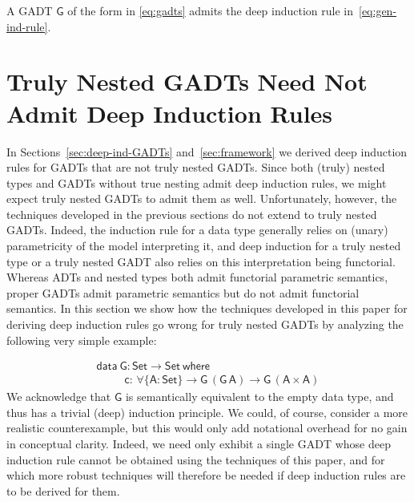 \documentclass[sigplan,10pt,anonymous,review]{acmart}
\begin{document}
\begin{theorem}
A GADT $\mathsf{G}$ of the form in \eqref{eq:gadts} admits the deep
induction rule in~\eqref{eq:gen-ind-rule}.
\end{theorem}

\section{Truly Nested GADTs Need Not Admit Deep Induction
    Rules}\label{sec:GADT-nested}

In Sections~\ref{sec:deep-ind-GADTs} and~\ref{sec:framework} we
derived deep induction rules for GADTs that are not truly nested
GADTs. Since both (truly) nested types and GADTs without true nesting
admit deep induction rules, we might expect truly nested GADTs to
admit them as well. Unfortunately, however, the techniques developed
in the previous sections do not extend to truly nested GADTs. Indeed,
the induction rule for a data type generally relies on (unary)
parametricity of the model interpreting it, and deep induction for a
truly nested type or a truly nested GADT also relies on this
interpretation being functorial.  Whereas ADTs and nested types both
admit functorial parametric semantics, proper GADTs admit parametric
semantics but do not admit functorial semantics. In this section we
show how the techniques developed in this paper for deriving deep
induction rules go wrong for truly nested GADTs by analyzing the
following very simple example:

\vspace*{-0.1in}

\begin{equation*}\label{gadt-nested}
\begin{array}{l}
\mathsf{data\ G : Set \to Set\ where}\\
\mathsf{\;\;\;\;\;\;\;\;\;c :\,  \forall \{A : Set\} \to G\,(G\,A) \to G\,(A \times A)}
\end{array}
\end{equation*}
We acknowledge that $\mathsf{G}$ is semantically equivalent to the
empty data type, and thus has a trivial (deep) induction principle. We
could, of course, consider a more realistic counterexample, but this
would only add notational overhead for no gain in conceptual
clarity. Indeed, we need only exhibit a single GADT whose deep
induction rule cannot be obtained using the techniques of this paper,
and for which more robust techniques will therefore be needed if deep
induction rules are to be derived for them.
\end{document}
